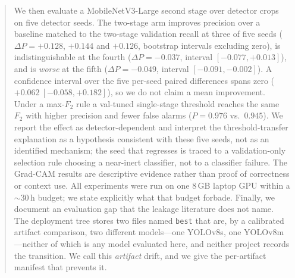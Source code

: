 \begin{abstract}
We then evaluate a MobileNetV3-Large second stage over detector crops on five
detector seeds. The two-stage arm improves precision over a baseline matched to
the two-stage validation recall at three of five seeds ($\Delta P = +0.128$,
$+0.144$ and $+0.126$, bootstrap intervals excluding zero), is indistinguishable
at the fourth ($\Delta P = -0.037$, interval $[-0.077, +0.013]$), and is
\emph{worse} at the fifth ($\Delta P = -0.049$, interval $[-0.091, -0.002]$). A
confidence interval over the five per-seed paired differences spans zero
($+0.062\ [-0.058, +0.182]$), so we do not claim a mean improvement. Under a
max-$F_2$ rule a val-tuned single-stage threshold reaches the same $F_2$ with
higher precision and fewer false alarms ($P = 0.976$ vs.\ $0.945$). We report
the effect as detector-dependent
and interpret the threshold-transfer explanation as a hypothesis consistent with
these five seeds, not as an identified mechanism; the seed that regresses is
traced to a validation-only selection rule choosing a near-inert classifier, not
to a classifier failure. The Grad-CAM results are descriptive evidence rather
than proof of correctness or context use. All experiments were run on one 8\,GB
laptop GPU within a $\sim$30\,h budget; we state explicitly what that budget
forbade. Finally, we document an evaluation gap that the leakage literature does
not name. The deployment tree stores two files named \texttt{best} that are, by a
calibrated artifact comparison, two different models---one YOLOv8s, one
YOLOv8m---neither of which is any model evaluated here, and neither project records
the transition. We call this \emph{artifact} drift, and we give the per-artifact
manifest that prevents it.
\end{abstract}
